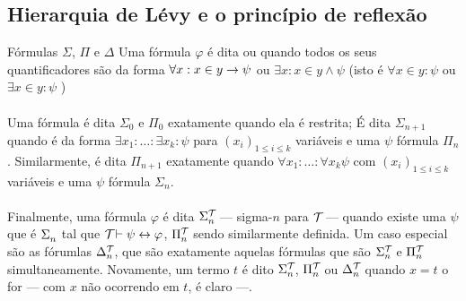         \subsection{Hierarquia de Lévy e o princípio de reflexão}
            \begin{definition}{Fórmulas $\Sigma$, $\Pi$ e $\Delta$}
                    Uma fórmula $\varphi$ é dita  ou  quando todos os 
                    seus quantificadores são da forma $\forall x : x\in y \rightarrow \psi$ ou 
                    $\exists x : x\in y \land \psi$
                    (isto é $\forall x\in y : \psi$ ou $\exists x\in y : \psi$ )
                \paragraph{}
                    Uma fórmula é dita $\Sigma_0$ e $\Pi_0$ exatamente quando ela é restrita; É dita
                    $\Sigma_{n+1}$ quando é da forma $\exists x_1:\ldots:\exists x_k: \psi$ para 
                    $(x_i)_{1\leq i\leq k}$ variáveis e uma 
                    $\psi$ fórmula $\Pi_n$. Similarmente, é dita $\Pi_{n+1}$ exatamente quando 
                    $\forall x_1:\ldots:\forall x_k\psi$ com $(x_i)_{1\leq i\leq k}$ variáveis 
                    e uma $\psi$ fórmula $\Sigma_n$.
                \paragraph{}
                    Finalmente, uma fórmula $\varphi$ é dita $\Sigma^{\mathcal{T}_{}}_{n}$ --- sigma-$n$ para 
                    $\mathcal{T}_{}$ --- quando existe uma $\psi$ que é $\Sigma^{}_{n}$ tal que $\mathcal{T}_{}\vdash\psi\leftrightarrow\varphi$,
                    $\Pi^{\mathcal{T}_{}}_{n}$ sendo similarmente definida.
                    Um caso especial são as fórumlas $\Delta^{\mathcal{T}_{}}_{n}$, que são exatamente aquelas 
                    fórmulas que são $\Sigma^{\mathcal{T}_{}}_n$ e $\Pi^{\mathcal{T}_{}}_n$ simultaneamente. 
                    Novamente, um termo $t$
                    é dito $\Sigma^{\mathcal{T}_{}}_{n}$, $\Pi^{\mathcal{T}_{}}_{n}$ ou $\Delta^{\mathcal{T}_{}}_{n}$ 
                    quando $x = t$ o for --- com $x$ não ocorrendo em $t$, é claro ---.
            \end{definition}
